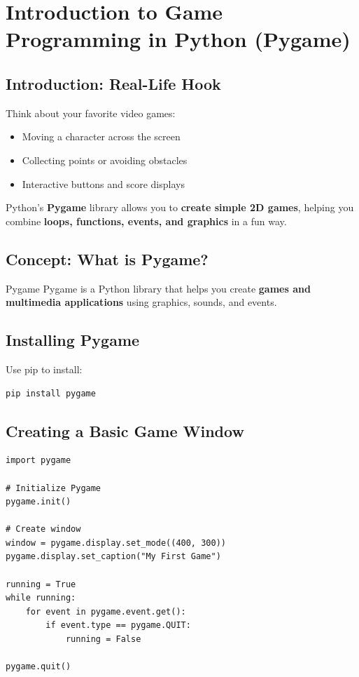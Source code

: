 \chapter{Introduction to Game Programming in Python (Pygame)}

\section{Introduction: Real-Life Hook}

Think about your favorite video games:  

\begin{itemize}
    \item Moving a character across the screen  
    \item Collecting points or avoiding obstacles  
    \item Interactive buttons and score displays  
\end{itemize}

Python’s \textbf{Pygame} library allows you to \textbf{create simple 2D games}, helping you combine \textbf{loops, functions, events, and graphics} in a fun way.

\section{Concept: What is Pygame?}

\begin{definition}{Pygame}
Pygame is a Python library that helps you create \textbf{games and multimedia applications} using graphics, sounds, and events.
\end{definition}

\section{Installing Pygame}

Use pip to install:

\begin{verbatim}
pip install pygame
\end{verbatim}

\section{Creating a Basic Game Window}

\begin{verbatim}
import pygame

# Initialize Pygame
pygame.init()

# Create window
window = pygame.display.set_mode((400, 300))
pygame.display.set_caption("My First Game")

running = True
while running:
    for event in pygame.event.get():
        if event.type == pygame.QUIT:
            running = False

pygame.quit()
\end{verbatim}

